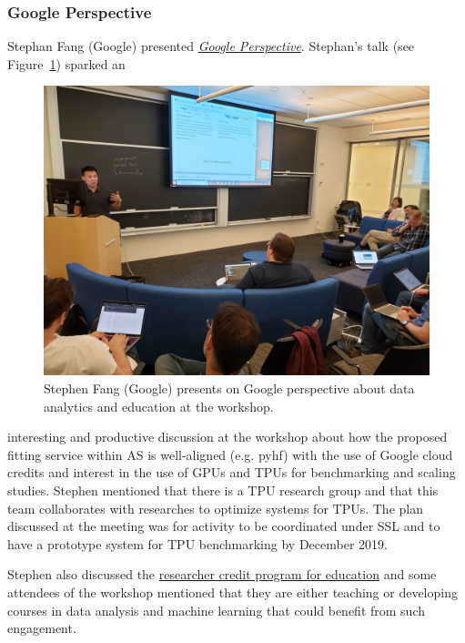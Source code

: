\documentclass[11pt,letterpaper,fleqn]{article}
\begin{document}
\subsubsection{Google Perspective}
\vspace{0.2cm}
Stephan Fang (Google) presented \href{https://indico.cern.ch/event/820946/contributions/3461593/attachments/1867157/3070794/go}{\textit{Google Perspective}}. Stephan's talk (see Figure~\ref{fig:google}) sparked an \begin{figure}
  \vspace{-0.4cm}
  \includegraphics[width=0.99\linewidth]{figures/google.jpg}
  \vspace{-0.7cm}
  \caption{Stephen Fang (Google) presents on Google perspective about data analytics and education at the workshop.}
  \label{fig:google}
\end{figure}
interesting and productive discussion at the workshop about how the proposed fitting service within AS is well-aligned (e.g. pyhf) with the use of Google cloud credits and interest in the use of GPUs and TPUs for benchmarking and scaling studies. Stephen mentioned that there is a TPU research group and that this team collaborates with researches to optimize systems for TPUs. The plan discussed at the meeting was for activity to be coordinated under SSL and to have a prototype system for TPU benchmarking by December 2019.

Stephen also discussed the
\href{https://edu.google.com/programs/credits/?modal_active=none}{researcher credit program for education} and some attendees of the workshop mentioned that they are either teaching or developing courses in data analysis and machine learning that could benefit from such engagement.
\end{document}
